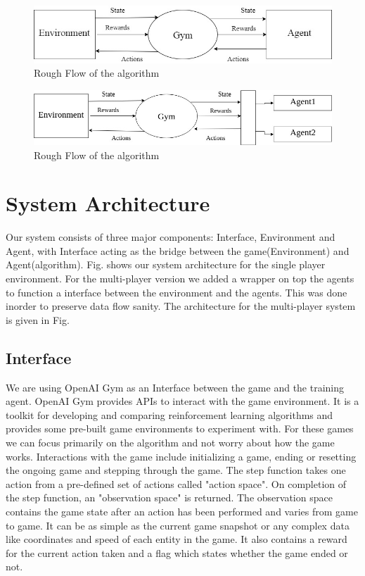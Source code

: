 \documentclass[conference,10pt]{IEEEtran}
\begin{document}
\begin{figure}[]
	
	\includegraphics[width=\linewidth]{flow.jpg}
	\caption{Rough Flow of the algorithm}
	\label{sia}
	
\end{figure}
\begin{figure}[]
	
	\includegraphics[width=\linewidth]{multi_agent.jpg}
	\caption{Rough Flow of the algorithm}
	\label{ma}
	
\end{figure}
	\section{System Architecture}
		
	Our system consists of three major components: Interface, Environment and Agent, with Interface acting as the bridge between the game(Environment) and Agent(algorithm). Fig. \label{[sia]} shows our system architecture for the single player environment. For the multi-player version we added a wrapper on top the agents to function a interface between the environment and the agents. This was done inorder to preserve data flow sanity. The architecture for the multi-player system is given in Fig. \label{[ma]}

	\subsection{Interface}
	We are using OpenAI Gym\cite{sd3} as an Interface between the game and the training agent. OpenAI Gym provides APIs to interact with the game environment. It is a toolkit for developing and comparing reinforcement learning algorithms and provides some pre-built game environments to experiment with. For these games we can focus primarily on the algorithm and not worry about how the game works. Interactions with the game include initializing a game, ending or resetting the ongoing game and stepping through the game. The step function takes one action from a pre-defined set of actions called "action space". On completion of the step function, an "observation space" is returned. The observation space contains the game state after an action has been performed and varies from game to game. It can be as simple as the current game snapshot  or any complex data like coordinates and speed of each entity in the game. It also contains a reward for the current action taken and a flag which states whether the game ended or not.
\end{document}
